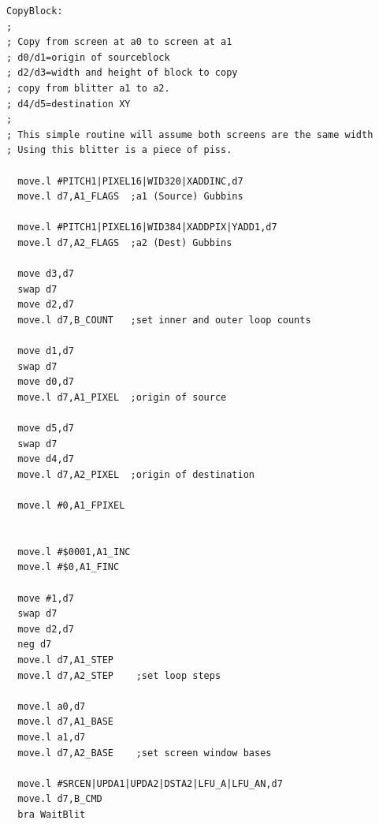 \clearpage
\begin{lstlisting}[escapechar=\%]
CopyBlock:
;
; Copy from screen at a0 to screen at a1
; d0/d1=origin of sourceblock
; d2/d3=width and height of block to copy
; copy from blitter a1 to a2.
; d4/d5=destination XY
;
; This simple routine will assume both screens are the same width
; Using this blitter is a piece of piss.

  move.l #PITCH1|PIXEL16|WID320|XADDINC,d7
  move.l d7,A1_FLAGS  ;a1 (Source) Gubbins

  move.l #PITCH1|PIXEL16|WID384|XADDPIX|YADD1,d7
  move.l d7,A2_FLAGS  ;a2 (Dest) Gubbins

  move d3,d7
  swap d7
  move d2,d7
  move.l d7,B_COUNT   ;set inner and outer loop counts

  move d1,d7
  swap d7
  move d0,d7
  move.l d7,A1_PIXEL  ;origin of source

  move d5,d7
  swap d7
  move d4,d7
  move.l d7,A2_PIXEL  ;origin of destination

  move.l #0,A1_FPIXEL


  move.l #$0001,A1_INC
  move.l #$0,A1_FINC

  move #1,d7
  swap d7
  move d2,d7
  neg d7
  move.l d7,A1_STEP
  move.l d7,A2_STEP    ;set loop steps

  move.l a0,d7
  move.l d7,A1_BASE
  move.l a1,d7
  move.l d7,A2_BASE    ;set screen window bases

  move.l #SRCEN|UPDA1|UPDA2|DSTA2|LFU_A|LFU_AN,d7
  move.l d7,B_CMD
  bra WaitBlit
\end{lstlisting}

